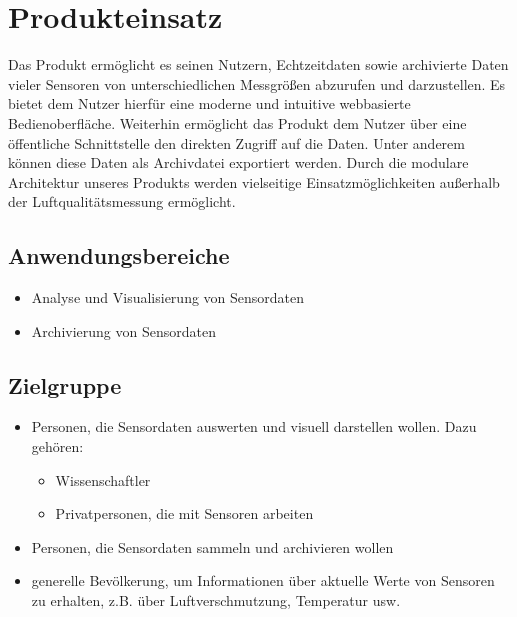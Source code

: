 \chapter{Produkteinsatz}
Das Produkt ermöglicht es seinen Nutzern, Echtzeitdaten sowie archivierte Daten vieler Sensoren von unterschiedlichen Messgrößen abzurufen und darzustellen. Es bietet dem Nutzer hierfür eine moderne und intuitive webbasierte Bedienoberfläche. Weiterhin ermöglicht das Produkt dem Nutzer über eine öffentliche Schnittstelle den direkten Zugriff auf die Daten. Unter anderem können diese Daten als Archivdatei exportiert werden. Durch die modulare Architektur unseres Produkts werden vielseitige Einsatzmöglichkeiten außerhalb der Luftqualitätsmessung ermöglicht.
\section{Anwendungsbereiche}
\begin{itemize}
	\item Analyse und Visualisierung von Sensordaten
	\item Archivierung von Sensordaten
\end{itemize}
\section{Zielgruppe}
\begin{itemize}
	\item Personen, die Sensordaten auswerten und visuell darstellen wollen. Dazu gehören:
	\begin{itemize}
		\item Wissenschaftler
		\item Privatpersonen, die mit Sensoren arbeiten
	\end{itemize}
	\item Personen, die Sensordaten sammeln und archivieren wollen
	\item generelle Bevölkerung, um Informationen über aktuelle Werte von Sensoren zu erhalten, z.B. über Luftverschmutzung, Temperatur usw.
\end{itemize}
